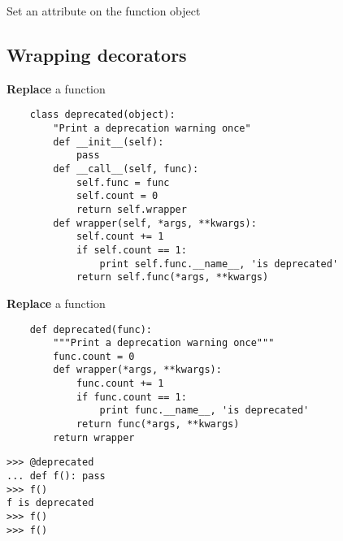\documentclass{beamer}
\begin{document}
\begin{frame}[fragile]{Set an attribute on the function object}
\end{frame}

\subsection{Wrapping decorators}

\begin{frame}[fragile]{\textbf{Replace} a function}
  \begin{verbatim}
    class deprecated(object):
        "Print a deprecation warning once"
        def __init__(self):
            pass
        def __call__(self, func):
            self.func = func
            self.count = 0
            return self.wrapper
        def wrapper(self, *args, **kwargs):
            self.count += 1
            if self.count == 1:
                print self.func.__name__, 'is deprecated'
            return self.func(*args, **kwargs)
  \end{verbatim}
\end{frame}

\begin{frame}[fragile]{\textbf{Replace} a function}
  \begin{verbatim}
    def deprecated(func):
        """Print a deprecation warning once"""
        func.count = 0
        def wrapper(*args, **kwargs):
            func.count += 1
            if func.count == 1:
                print func.__name__, 'is deprecated'
            return func(*args, **kwargs)
        return wrapper
  \end{verbatim}

  \pause
  \begin{verbatim}
>>> @deprecated
... def f(): pass
>>> f()
f is deprecated
>>> f()
>>> f()
  \end{verbatim}
\end{frame}
\end{document}
